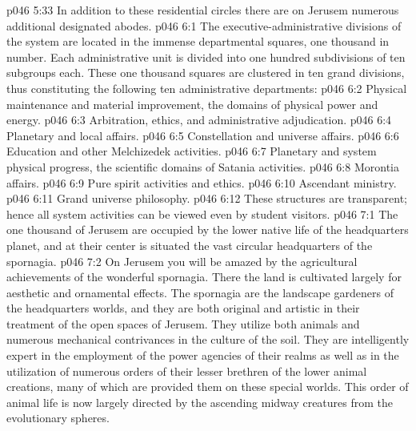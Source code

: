 \pc \vs p046 5:33  In addition to these residential circles there are on Jerusem numerous additional designated abodes.
\vs p046 6:1 The executive\hyp{}administrative divisions of the system are located in the immense departmental squares, one thousand in number. Each administrative unit is divided into one hundred subdivisions of ten subgroups each. These one thousand squares are clustered in ten grand divisions, thus constituting the following ten administrative departments:\plusone
\pc \vs p046 6:2 \bibnobreakspace Physical maintenance and material improvement, the domains of physical power and energy.
\vs p046 6:3 \bibnobreakspace Arbitration, ethics, and administrative adjudication.
\vs p046 6:4 \bibnobreakspace Planetary and local affairs.
\vs p046 6:5 \bibnobreakspace Constellation and universe affairs.
\vs p046 6:6 \bibnobreakspace Education and other Melchizedek activities.
\vs p046 6:7 \bibnobreakspace Planetary and system physical progress, the scientific domains of Satania activities.
\vs p046 6:8 \bibnobreakspace Morontia affairs.
\vs p046 6:9 \bibnobreakspace Pure spirit activities and ethics.
\vs p046 6:10 \bibnobreakspace Ascendant ministry.
\vs p046 6:11 \bibnobreakspace Grand universe philosophy.
\pc \vs p046 6:12 These structures are transparent; hence all system activities can be viewed even by student visitors.
\vs p046 7:1 The one thousand  of Jerusem are occupied by the lower native life of the headquarters planet, and at their center is situated the vast circular headquarters of the spornagia.
\vs p046 7:2 On Jerusem you will be amazed by the agricultural achievements of the wonderful spornagia. There the land is cultivated largely for aesthetic and ornamental effects. The spornagia are the landscape gardeners of the headquarters worlds, and they are both original and artistic in their treatment of the open spaces of Jerusem. They utilize both animals and numerous mechanical contrivances in the culture of the soil. They are intelligently expert in the employment of the power agencies of their realms as well as in the utilization of numerous orders of their lesser brethren of the lower animal creations, many of which are provided them on these special worlds. This order of animal life is now largely directed by the ascending midway creatures from the evolutionary spheres.
